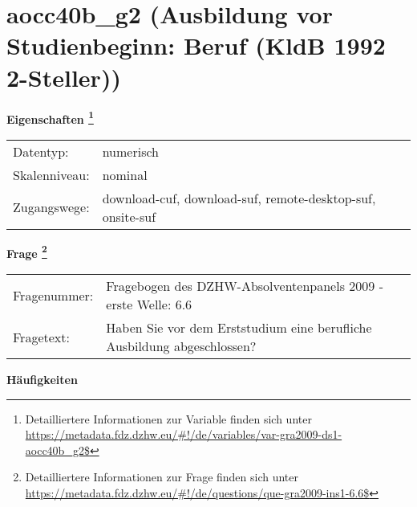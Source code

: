 
    \setcounter{footnote}{0}

    \vspace*{-1.8cm}
	\section{aocc40b\_g2 (Ausbildung vor Studienbeginn: Beruf (KldB 1992 2-Steller))}
	\label{section:aocc40b_g2}



    \vspace*{0.5cm}
    \noindent\textbf{Eigenschaften
	\footnote{Detailliertere Informationen zur Variable finden sich unter
		\url{https://metadata.fdz.dzhw.eu/\#!/de/variables/var-gra2009-ds1-aocc40b_g2$}}}\\
	\begin{tabularx}{\hsize}{@{}lX}
	Datentyp: & numerisch \\
	Skalenniveau: & nominal \\
	Zugangswege: &
	  download-cuf, 
	  download-suf, 
	  remote-desktop-suf, 
	  onsite-suf
 \\
    \end{tabularx}



				\vspace*{0.5cm}
                \noindent\textbf{Frage
	                \footnote{Detailliertere Informationen zur Frage finden sich unter
		              \url{https://metadata.fdz.dzhw.eu/\#!/de/questions/que-gra2009-ins1-6.6$}}}\\
				\begin{tabularx}{\hsize}{@{}lX}
					Fragenummer: &
					  Fragebogen des DZHW-Absolventenpanels 2009 - erste Welle:
					  6.6
 \\
					Fragetext: & Haben Sie vor dem Erststudium eine berufliche Ausbildung abgeschlossen? \\
				\end{tabularx}





        		\vspace*{0.5cm}
                \noindent\textbf{Häufigkeiten}

